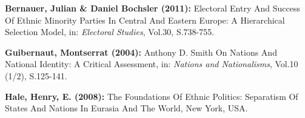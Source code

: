 \begin{compactitem}





\begin{small}


	\item [\Rectsteel] \textbf{Bernauer, Julian \& Daniel Bochsler (2011):} Electoral Entry And Success Of Ethnic Minority Parties In Central And Eastern Europe: A Hierarchical Selection Model, in: \textsl{Electoral Studies}, Vol.30, S.738-755.


	\item [\Rectsteel] \textbf{Guibernaut, Montserrat (2004):} Anthony D. Smith On Nations And National Identity: A Critical Assessment, in: \textsl{Nations and Nationalisms}, Vol.10 (1/2), S.125-141.

	\item [\Rectsteel] \textbf{Hale, Henry, E. (2008):} The Foundations Of Ethnic Politics: Separatism Of States And Nations In Eurasia And The World, New York, USA.


\end{small}



	\end{compactitem}
